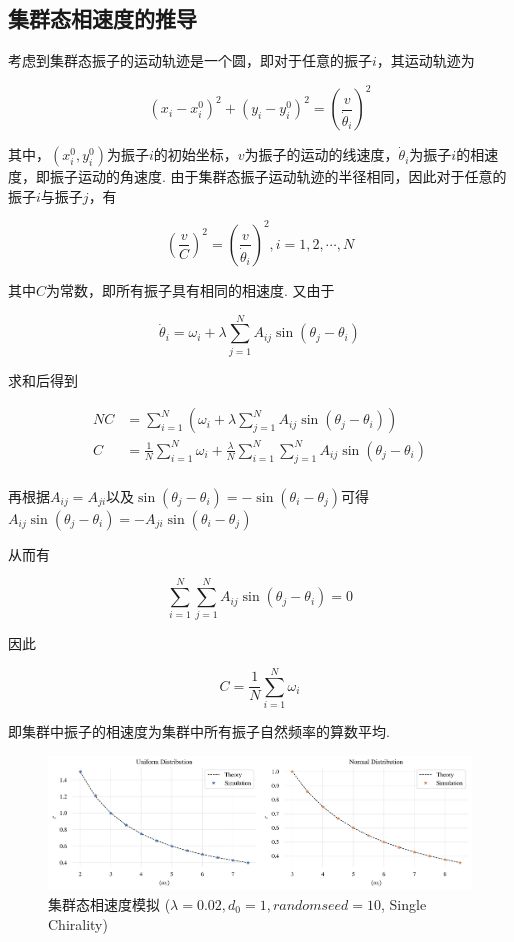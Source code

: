 \documentclass{article}
\begin{document}
\subsection{集群态相速度的推导}

考虑到集群态振子的运动轨迹是一个圆，即对于任意的振子$i$，其运动轨迹为

$$
\left( x_i-x_{i}^{0} \right) ^2+\left( y_i-y_{i}^{0} \right) ^2=\left( \frac{v}{\dot{\theta}_i} \right) ^2
$$

其中，$\left( x_{i}^{0},y_{i}^{0} \right)$为振子$i$的初始坐标，$v$为振子的运动的线速度，$\dot{\theta}_i$为振子$i$的相速度，即振子运动的角速度. 由于集群态振子运动轨迹的半径相同，因此对于任意的振子$i$与振子$j$，有

$$
\left( \frac{v}{C} \right) ^2=\left( \frac{v}{\dot{\theta}_i} \right) ^2,i=1,2,\cdots ,N
$$

其中$C$为常数，即所有振子具有相同的相速度. 又由于

$$
\dot{\theta}_i=\omega _i+\lambda \sum_{j=1}^N{A_{ij}\sin \left( \theta _j-\theta _i \right)}
$$

求和后得到
\vspace{-0.5cm}

$$
\begin{aligned}
	NC&=\sum_{i=1}^N{\left( \omega _i+\lambda \sum_{j=1}^N{A_{ij}\sin \left( \theta _j-\theta _i \right)} \right)}\\
	C&=\frac{1}{N}\sum_{i=1}^N{\omega _i}+\frac{\lambda}{N}\sum_{i=1}^N{\sum_{j=1}^N{A_{ij}\sin \left( \theta _j-\theta _i \right)}}\\
\end{aligned}
$$

再根据$A_{ij}=A_{ji}$以及$\sin \left( \theta _j-\theta _i \right)=-\sin \left( \theta _i-\theta _j \right)$可得$
A_{ij}\sin \left( \theta _j-\theta _i \right) =-A_{ji}\sin \left( \theta _i-\theta _j \right) 
$

从而有

$$
\sum_{i=1}^N{\sum_{j=1}^N{A_{ij}\sin \left( \theta _j-\theta _i \right)}}=0
$$

因此
\vspace{-0.5cm}

\begin{equation}\label{eq:eq2.2.1}
	C=\frac{1}{N}\sum_{i=1}^N{\omega _i}
\end{equation}

即集群中振子的相速度为集群中所有振子自然频率的算数平均.

\begin{figure}[H]
	\centering
	\includegraphics[width=\textwidth]{./figs/swarmRadiusSimu.png}
	\vspace{-1cm}
	\caption{集群态相速度模拟 ($\lambda=0.02, d_0=1, random seed=10$, Single Chirality)}
	\label{fig:fig22}
\end{figure}
\end{document}
